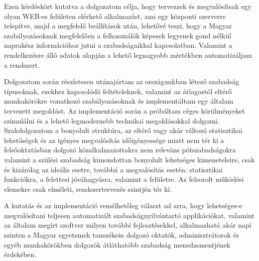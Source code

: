 Ezen kérdéskört kutatva a dolgozatom célja, hogy tervezzek és megvalósítsak egy olyan WEB-es felületen elérhető alkalmazást, ami egy központi szerverre telepítve, majd a megfelelő beállítások után, lehetővé teszi, hogy a Magyar szabályozásoknak megfelelően a felhasználók képesek legyenek gond nélkül naprakész információhoz jutni a szabadságaikkal kapcsolatban. Valamint a rendelkezésre álló adatok alapján a lehető legnagyobb mértékben automatizáljam a rendszert. 

Dolgozatom során részletesen utánajártam az országunkban létező szabadság típusoknak, ezekhez kapcsolódó feltételeknek, valamint az átlagostól eltérő munkakörökre vonatkozó szabályozásoknak és implementáltam egy általam tervezett megoldást. Az implementáció során a próbáltam céges körülményeket szimulálni és a lehető legmodernebb technikai megoldásokkal dolgozni. Szakdolgozatom a bonyolult struktúra, az eltérő vagy akár változó statisztikai lehetőségek és az igényes megvalósítás időigényessége miatt nem tér ki a felsőoktatásban dolgozó közalkalmazottakra nem releváns pótszabadságokra valamint a szülési szabadság kimondottan bonyolult lehetséges kimeneteleire, csak és kizárólag az ideális esetre, továbbá a megvalósítás esetén: statisztikai funkciókra, a felettesi jóváhagyásra, valamint a felületre. Az felsorolt működési elemekre csak elméleti, rendszertervezés szintjén tér ki.

A kutatás és az implementáció remélhetőleg választ ad arra, hogy lehetséges-e megvalósítani teljesen automatizált szabadságnyilvántartó applikációkat, valamint az általam megírt szoftver milyen további fejlesztésekkel, alkalmazható akár napi szinten a Magyar egyetemek tanszékein dolgozó oktatók, adminisztrátorok és egyéb munkakörökben dolgozók átláthatóbb szabadság menedzsmentjének érdekében.  